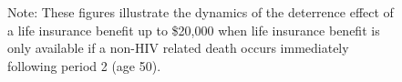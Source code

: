 \documentclass[12pt]{article}
\begin{document}
\begin{figure}
\begin{center}
\begin{tabular}{cc}
\end{tabular}
\parbox{6.5in}{\footnotesize{Note: These figures illustrate the dynamics of the deterrence effect of a life insurance benefit up to \$20,000 when life insurance benefit is only available if a non-HIV related death occurs immediately following period 2 (age 50).}}
\end{center}
\end{figure}
\end{document}
